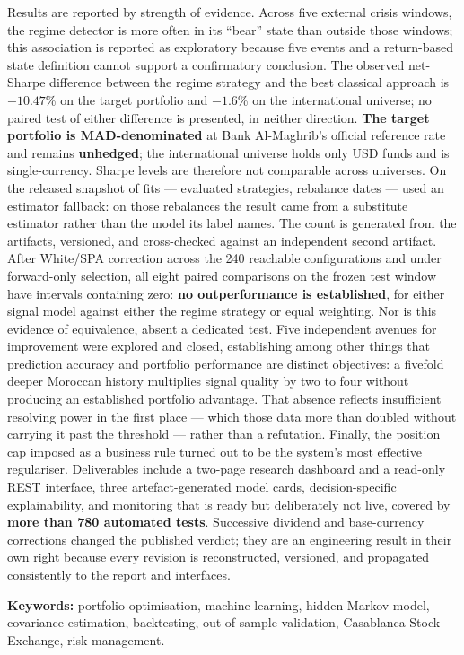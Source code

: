 Results are reported by strength of evidence. Across five external crisis
windows, the regime detector is more often in its ``bear'' state than outside
those windows; this association is reported as exploratory because five events
and a return-based state definition cannot support a confirmatory conclusion.
The observed net-Sharpe difference between the regime strategy and the best
classical approach is $-10.47$\% on the target portfolio and $-1.6$\% on the
international universe; no paired test of either difference is presented, in
neither direction. \textbf{The target portfolio is MAD-denominated} at Bank
Al-Maghrib's official reference rate and remains \textbf{unhedged}; the
international universe holds only USD funds and is single-currency. Sharpe
levels are therefore not comparable across universes. On the released snapshot
\integriteReplis{} of \integriteAjustements{} fits — \integriteStrategies{} evaluated
strategies, \integriteDates{} rebalance dates — used an estimator fallback: on those
rebalances the result came from a substitute estimator rather than the model its
label names. The count is generated from the artifacts, versioned, and cross-checked
against an independent second artifact. After White/SPA
correction across the 240 reachable configurations and under forward-only
selection, all eight paired comparisons on the frozen test
window have intervals containing zero: \textbf{no outperformance is established},
for either signal model against either the regime strategy or equal weighting.
Nor is this evidence of equivalence, absent a dedicated test.
Five independent avenues for improvement were explored and closed, establishing
among other things that prediction accuracy and portfolio performance are
distinct objectives: a fivefold deeper Moroccan history multiplies signal
quality by two to four without producing an established portfolio advantage.
That absence reflects insufficient resolving power in the first place --- which
those data more than doubled without carrying it past the threshold --- rather
than a refutation. Finally, the position cap imposed as a business rule turned
out to be the system's most effective regulariser. Deliverables include a
two-page research dashboard and a read-only REST interface, three
artefact-generated model cards, decision-specific explainability, and monitoring
that is ready but deliberately not live, covered by \textbf{more than 780 automated
tests}. Successive dividend and base-currency corrections changed the published
verdict; they are an engineering result in their own right because every
revision is reconstructed, versioned, and propagated consistently to the report
and interfaces.

\vspace{0.6em}
\noindent\textbf{Keywords:} portfolio optimisation, machine learning, hidden
Markov model, covariance estimation, backtesting, out-of-sample validation,
Casablanca Stock Exchange, risk management.
